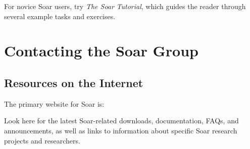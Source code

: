 For novice Soar users, try \textit{The Soar} \textit{\SoarVersionMajor} \textit{Tutorial}, which guides the reader 
through several example tasks and exercises.


%
%
\section{Contacting the Soar Group}
\label{CONTACT}

\subsection*{Resources on the Internet}

The primary website for Soar is:

\hspace{2em}

Look here for the latest Soar-related downloads, documentation, FAQs, and announcements, as well
as links to information about specific Soar research projects and researchers.

